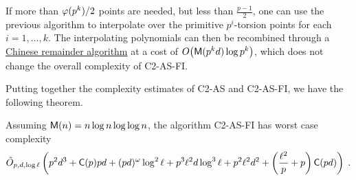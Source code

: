 If more than $\varphi(p^k)/2$ points are needed, but less than
$\frac{p-1}{2}$, one can use the previous algorithm to interpolate
over the primitive $p^i$-torsion points for each $i=1,\ldots,k$. The
interpolating polynomials can then be recombined through a
\hyperref[sec:chin-rema-algor]{Chinese remainder algorithm} at a cost
of $O\bigl(\mathsf{M}(p^kd)\log p^k\bigr)$, which does not change the
overall complexity of C2-AS-FI.


Putting together the complexity estimates of C2-AS and C2-AS-FI, we
have the following theorem.

\begin{theorem}
  \label{th:complexity}
  Assuming $\mathsf{M}(n) = n\log n\log\log n$, the algorithm C2-AS-FI has
  worst case complexity
  \begin{equation*}
    \tilde{O}_{p,d,\log\ell}\left(
      p^2d^3 +
      \mathsf{C}(p)pd +
      (pd)^\omega\log^2\ell +
      p^3\ell^2 d\log^3\ell + 
      p^2\ell^2 d^2+
      \left(\frac{\ell^2}{p} + p\right)\mathsf{C}(pd)
    \right)
    \;\text{.}
  \end{equation*}
\end{theorem}



%
